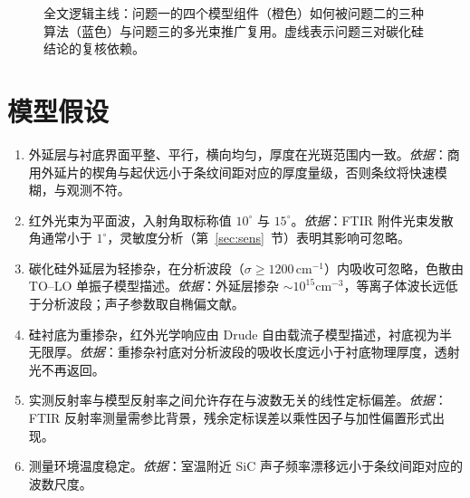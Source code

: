 \documentclass[11pt,a4paper,fontset=fandol]{ctexart}
\newcommand{\invcm}{\,\mathrm{cm^{-1}}}
\begin{document}
\begin{figure}[htbp]
    \caption{全文逻辑主线：问题一的四个模型组件（橙色）如何被问题二的三种算法（蓝色）与问题三的多光束推广复用。虚线表示问题三对碳化硅结论的复核依赖。}
    \label{fig:logic}
\end{figure}

\section{模型假设}
\begin{enumerate}[label=\textbf{假设\arabic*：}, leftmargin=3.6em, itemsep=0.15em]
    \item 外延层与衬底界面平整、平行，横向均匀，厚度在光斑范围内一致。\emph{依据}：商用外延片的楔角与起伏远小于条纹间距对应的厚度量级，否则条纹将快速模糊，与观测不符。
    \item 红外光束为平面波，入射角取标称值 $10^\circ$ 与 $15^\circ$。\emph{依据}：FTIR 附件光束发散角通常小于 $1^\circ$，灵敏度分析（第~\ref{sec:sens}~节）表明其影响可忽略。
    \item 碳化硅外延层为轻掺杂，在分析波段（$\sigma\ge1200\invcm$）内吸收可忽略，色散由 TO--LO 单振子模型描述。\emph{依据}：外延层掺杂 $\sim10^{15}\mathrm{cm}^{-3}$，等离子体波长远低于分析波段；声子参数取自椭偏文献\cite{madan2024}。
    \item 硅衬底为重掺杂，红外光学响应由 Drude 自由载流子模型描述，衬底视为半无限厚。\emph{依据}：重掺杂衬底对分析波段的吸收长度远小于衬底物理厚度，透射光不再返回。
    \item 实测反射率与模型反射率之间允许存在与波数无关的线性定标偏差。\emph{依据}：FTIR 反射率测量需参比背景，残余定标误差以乘性因子与加性偏置形式出现。
    \item 测量环境温度稳定。\emph{依据}：室温附近 SiC 声子频率漂移远小于条纹间距对应的波数尺度\cite{tong2018}。
\end{enumerate}
\end{document}
